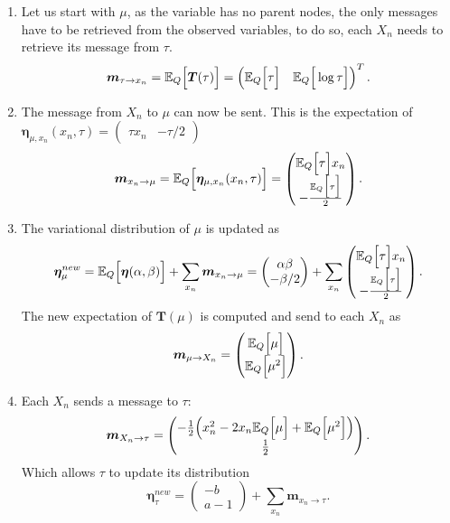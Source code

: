 \begin{enumerate}
  \item Let us start with \(\mu\), as the variable has no parent nodes, the only messages have to be retrieved from the observed variables, to do so, each \(X_{n}\) needs to retrieve its message from \(\tau\).
    \[
    \bm{m}_{\tau \to x_{n}} = \mathbb{E}_{Q}\Big[\bm{T}(\tau)\Big] = \begin{pmatrix} \mathbb{E}_{Q}\Big[\tau\Big] & \mathbb{E}_{Q}\Big[\log \tau\Big] \end{pmatrix}^{T}.
    \]
  \item The message from \(X_{n}\) to \(\mu\) can now be sent. This is the expectation of \(\bm{\eta}_{\mu, x_{n}}(x_{n}, \tau) = \begin{pmatrix} \tau x_{n} & -\tau /2 \end{pmatrix}\)
    \[
    \bm{m}_{x_{n} \to \mu} = \mathbb{E}_{Q}\Big[\bm{\eta}_{\mu, x_{n}}(x_{n}, \tau)\Big] = \begin{pmatrix} \mathbb{E}_{Q}\Big[\tau\Big] x_{n} \\ - \frac{\mathbb{E}_{Q}\Big[\tau\Big]}{2} \end{pmatrix}.
    \]
  \item The variational distribution of \(\mu\) is updated as
    \[
    \bm{\eta}_{\mu}^{new} = \mathbb{E}_{Q}\Big[\bm{\eta}(\alpha, \beta)\Big] + \sum_{x_{n}} \bm{m}_{x_{n} \to \mu} = \begin{pmatrix} \alpha \beta \\ -\beta/2  \end{pmatrix} + \sum_{x_{n}} \begin{pmatrix}   \mathbb{E}_{Q}\Big[\tau\Big] x_{n} \\ - \frac{\mathbb{E}_{Q}\Big[\tau\Big]}{2} \end{pmatrix}.
    \]
    The new expectation of \(\bm{T}(\mu)\) is computed and send to each \(X_{n}\) as
    \[
    \bm{m}_{\mu \to X_{n}} = \begin{pmatrix} \mathbb{E}_{Q}\Big[\mu\Big] \\ \mathbb{E}_{Q}\Big[\mu^{2}\Big] \end{pmatrix}.
    \]
  \item Each \(X_{n}\) sends a message to \(\tau\):
    \[
    \bm{m}_{X_{n} \to \tau} = \begin{pmatrix} -\frac{1}{2}\Big(x_{n}^{2} - 2x_{n}\mathbb{E}_{Q}\Big[\mu\Big] + \mathbb{E}_{Q}\Big[\mu^{2}\Big]\Big) \\ \frac{1}{2} \end{pmatrix}.
    \]
    Which allows \(\tau\) to update its distribution
    \[
    \bm{\eta}^{new}_{\tau} = \begin{pmatrix} -b \\ a - 1 \end{pmatrix} + \sum_{x_{n}} \bm{m}_{x_{n} \to \tau}.
    \]
\end{enumerate}



